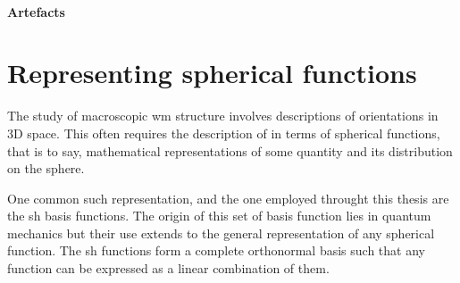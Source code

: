\paragraph*{Artefacts}


\section{Representing spherical functions}
\label{sec:sh}

The study of macroscopic \gls{wm} structure involves descriptions of orientations in 3D space.
This often requires the description of in terms of spherical functions, that is to say, mathematical representations of some quantity and its distribution on the sphere.

One common such representation, and the one employed throught this thesis are the \gls{sh} basis functions.
The origin of this set of basis function lies in quantum mechanics  but their use extends to the general representation of any spherical function.
The \gls{sh} functions form a complete orthonormal basis such that any  function can be expressed as a linear combination of them.

